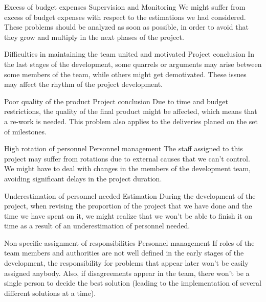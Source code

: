 \begin{risk}{Excess of budget expenses}
\riskcat Supervision and Monitoring
\riskdesc We might suffer from excess of budget expenses with respect to the estimations we had considered. These problems should be analyzed as soon as possible, in order to avoid that they grow and multiply in the next phases of the project.
\end{risk}

\begin{risk}{Difficulties in maintaining the team united and motivated}
\riskcat Project conclusion
\riskdesc In the last stages of the development, some quarrels or arguments may arise between some members of the team, while others might get demotivated. These issues may affect the rhythm of the project development.
\end{risk}

\begin{risk}{Poor quality of the product}
\riskcat Project conclusion
\riskdesc Due to time and budget restrictions, the quality of the final product might be affected, which means that a re-work is needed. This problem also applies to the deliveries planed on the set of milestones.
\end{risk}

\begin{risk}{High rotation of personnel}
\riskcat Personnel management
\riskdesc The staff assigned to this project may suffer from rotations due to external causes that we can't control. We might have to deal with changes in the members of the development team, avoiding significant delays in the project duration.
\end{risk}

\begin{risk}{Underestimation of personnel needed}
\riskcat Estimation
\riskdesc During the development of the project, when revising the proportion of the project that we have done and the time we have spent on it, we might realize that we won't be able to finish it on time as a result of an underestimation of personnel needed. 
\end{risk}

\begin{risk}{Non-specific assignment of responsibilities}
\riskcat Personnel management
\riskdesc If roles of the team members and authorities are not well defined in the early stages of the development, the responsibility for problems that appear later won't be easily assigned anybody. Also, if disagreements appear in the team, there won't be a single person to decide the best solution (leading to the implementation of several different solutions at a time).
\end{risk}

